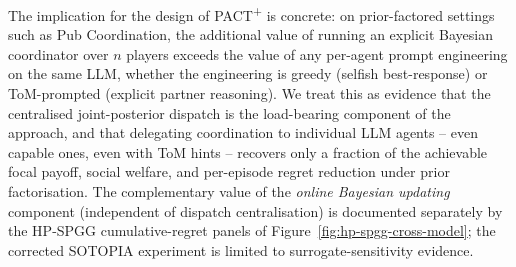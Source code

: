 The implication for the design of PACT\textsuperscript{+} is concrete: on prior-factored settings such as Pub Coordination, the additional value of running an explicit Bayesian coordinator over $n$ players exceeds the value of any per-agent prompt engineering on the same LLM, whether the engineering is greedy (selfish best-response) or ToM-prompted (explicit partner reasoning). We treat this as evidence that the centralised joint-posterior dispatch is the load-bearing component of the approach, and that delegating coordination to individual LLM agents -- even capable ones, even with ToM hints -- recovers only a fraction of the achievable focal payoff, social welfare, and per-episode regret reduction under prior factorisation. The complementary value of the \emph{online Bayesian updating} component (independent of dispatch centralisation) is documented separately by the HP-SPGG cumulative-regret panels of Figure~\ref{fig:hp-spgg-cross-model}; the corrected SOTOPIA experiment is limited to surrogate-sensitivity evidence.
